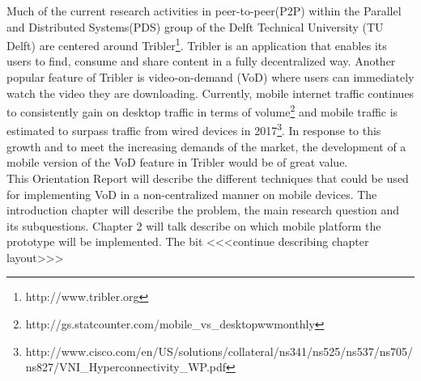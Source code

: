 Much of the current research activities in peer-to-peer(P2P) within the Parallel and Distributed Systems(PDS) group of the Delft Technical University (TU Delft) are centered around Tribler\footnote{http://www.tribler.org}. Tribler is an application that enables its users to find, consume and share content in a fully decentralized way. Another popular feature of Tribler is video-on-demand (VoD) where users can immediately watch the video they are downloading. Currently, mobile internet traffic continues to consistently gain on desktop traffic in terms of volume\footnote{http://gs.statcounter.com/mobile\_vs\_desktop\-ww\-monthly} and mobile traffic is estimated to surpass traffic from wired devices in 2017\footnote{http://www.cisco.com/en/US/solutions/collateral/ns341/ns525/ns537/ns705/ns827/VNI\_Hyperconnectivity\_WP.pdf}. In response to this growth and to meet the increasing demands of the market, the development of a mobile version of the VoD feature in Tribler would be of great value.\\
This Orientation Report will describe the different techniques that could be used for implementing VoD in a non-centralized manner on mobile devices. The introduction chapter will describe the problem, the main research question and its subquestions. Chapter 2 will talk describe on which mobile platform the prototype will be implemented. The bit <<<continue describing chapter layout>>> 